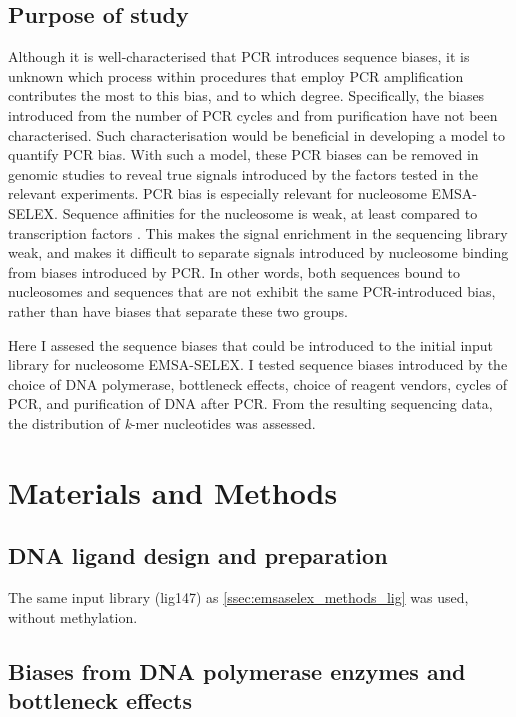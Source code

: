 \documentclass[parskip=full, numbers=noenddot]{scrbook}
\begin{document}
\subsection{Purpose of study}
\label{ssec:pcrbias_intro_why}

Although it is well-characterised that PCR introduces sequence biases, it is unknown which process within procedures that employ PCR amplification contributes the most to this bias, and to which degree.  Specifically, the biases introduced from the number of PCR cycles and from purification have not been characterised.  Such characterisation would be beneficial in developing a model to quantify PCR bias.  With such a model, these PCR biases can be removed in genomic studies to reveal true signals introduced by the factors tested in the relevant experiments.  PCR bias is especially relevant for nucleosome EMSA-SELEX.  Sequence affinities for the nucleosome is weak, at least compared to transcription factors \citep{struhl_determinants_2013}.  This makes the signal enrichment in the sequencing library weak, and makes it difficult to separate signals introduced by nucleosome binding from biases introduced by PCR.  In other words, both sequences bound to nucleosomes and sequences that are not exhibit the same PCR-introduced bias, rather than have biases that separate these two groups.

Here I assesed the sequence biases that could be introduced to the initial input library for nucleosome EMSA-SELEX.  I tested sequence biases introduced by the choice of DNA polymerase, bottleneck effects, choice of reagent vendors, cycles of PCR, and purification of DNA after PCR.  From the resulting sequencing data, the distribution of \emph{k}-mer nucleotides was assessed.

\section{Materials and Methods}
\label{sec:pcrbias_methods}

\subsection{DNA ligand design and preparation}
\label{ssec:pcrbias_methods_lig}

The same input library (lig147) as \ref{ssec:emsaselex_methods_lig} was used, without methylation.

\subsection{Biases from DNA polymerase enzymes and bottleneck effects}
\label{ssec:pcrbias_methods_enz}
\end{document}
